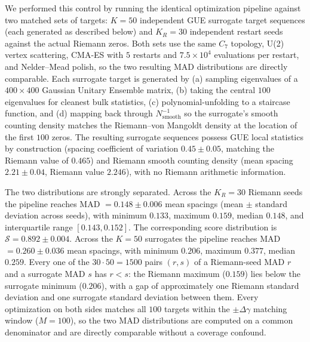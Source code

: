 \documentclass[cntp]{ipart}
\theoremstyle{plain}
\theoremstyle{remark}
\begin{document}
We performed this control by running the identical optimization pipeline against two matched sets of targets: $K = 50$ independent GUE surrogate target sequences (each generated as described below) and $K_R = 30$ independent restart seeds against the actual Riemann zeros. Both sets use the same $C_7$ topology, U(2) vertex scattering, CMA-ES with $5$ restarts and $7.5 \times 10^4$ evaluations per restart, and Nelder--Mead polish, so the two resulting MAD distributions are directly comparable. Each surrogate target is generated by (a) sampling eigenvalues of a $400 \times 400$ Gaussian Unitary Ensemble matrix, (b) taking the central $100$ eigenvalues for cleanest bulk statistics, (c) polynomial-unfolding to a staircase function, and (d) mapping back through $N_{\mathrm{smooth}}^{-1}$ so the surrogate's smooth counting density matches the Riemann--von Mangoldt density at the location of the first $100$ zeros. The resulting surrogate sequences possess GUE local statistics by construction (spacing coefficient of variation $0.45 \pm 0.05$, matching the Riemann value of $0.465$) and Riemann smooth counting density (mean spacing $2.21 \pm 0.04$, Riemann value $2.246$), with no Riemann arithmetic information.

The two distributions are strongly separated. Across the $K_R = 30$ Riemann seeds the pipeline reaches MAD $= 0.148 \pm 0.006$ mean spacings (mean $\pm$ standard deviation across seeds), with minimum $0.133$, maximum $0.159$, median $0.148$, and interquartile range $[0.143, 0.152]$. The corresponding score distribution is $\mathcal{S} = 0.892 \pm 0.004$. Across the $K = 50$ surrogates the pipeline reaches MAD $= 0.260 \pm 0.036$ mean spacings, with minimum $0.206$, maximum $0.377$, median $0.259$. Every one of the $30 \cdot 50 = 1500$ pairs $(r, s)$ of a Riemann-seed MAD $r$ and a surrogate MAD $s$ has $r < s$: the Riemann maximum ($0.159$) lies below the surrogate minimum ($0.206$), with a gap of approximately one Riemann standard deviation and one surrogate standard deviation between them. Every optimization on both sides matches all $100$ targets within the $\pm \Delta\gamma$ matching window ($M = 100$), so the two MAD distributions are computed on a common denominator and are directly comparable without a coverage confound.
\end{document}
